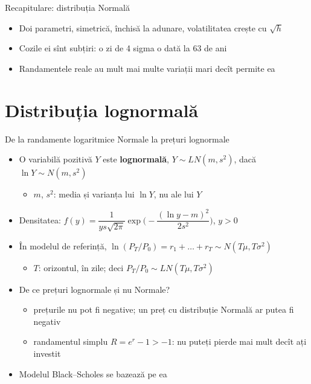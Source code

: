 \begin{frame}{Recapitulare: distribuția Normală}
\itemsize{\small}
\begin{itemize}
    \item Doi parametri, simetrică, închisă la adunare, volatilitatea crește cu $\sqrt{h}$
    \item Cozile ei sînt subțiri: o zi de 4 sigma o dată la 63 de ani
    \item Randamentele reale au mult mai multe variații mari decît permite ea
\end{itemize}
\end{frame}


\section{Distribuția lognormală}

\begin{frame}{De la randamente logaritmice Normale la prețuri lognormale}
\itemsize{\small}
\begin{itemize}
    \item O variabilă pozitivă $Y$ este \textbf{lognormală}, $Y \sim LN(m, s^2)$, dacă $\ln Y \sim N(m, s^2)$
    \begin{itemize}
        \item $m$, $s^2$: media și varianța lui $\ln Y$, nu ale lui $Y$
    \end{itemize}
    \item Densitatea: $f(y) = \dfrac{1}{y s\sqrt{2\pi}} \exp\Big(-\dfrac{(\ln y - m)^2}{2s^2}\Big)$, \quad $y > 0$
    \item În modelul de referință, $\ln(P_T/P_0) = r_1 + \dots + r_T \sim N(T\mu, T\sigma^2)$
    \begin{itemize}
        \item $T$: orizontul, în zile; deci $P_T/P_0 \sim LN(T\mu, T\sigma^2)$ 
    \end{itemize}
    \item De ce prețuri lognormale și nu Normale?
    \begin{itemize}
        \item prețurile nu pot fi negative; un preț cu distribuție Normală ar putea fi negativ
        \item randamentul simplu $R = e^r - 1 > -1$: nu puteți pierde mai mult decît ați investit
    \end{itemize}
    \item Modelul Black--Scholes se bazează pe ea
\end{itemize}
\end{frame}

